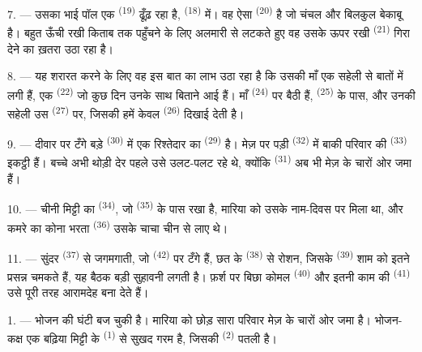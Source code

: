 \VUsaut{5.0mm}
\VUsaut{3.0mm}

7. --- उसका भाई पॉल एक  \textsuperscript{(19)} ढूँढ़ रहा है,
 \textsuperscript{(18)} में। वह ऐसा 
\textsuperscript{(20)} है जो चंचल और बिलकुल बेकाबू है। बहुत ऊँची रखी किताब तक
पहुँचने के लिए अलमारी से लटकते हुए वह उसके ऊपर रखी 
\textsuperscript{(21)} गिरा देने का ख़तरा उठा रहा है।

8. --- यह शरारत करने के लिए वह इस बात का लाभ उठा रहा है कि उसकी माँ एक सहेली से
बातों में लगी हैं, एक  \textsuperscript{(22)} जो कुछ दिन उनके साथ
बिताने आई हैं। माँ  \textsuperscript{(24)} पर बैठी हैं,
 \textsuperscript{(25)} के पास, और उनकी सहेली उस
 \textsuperscript{(27)} पर, जिसकी हमें केवल 
\textsuperscript{(26)} दिखाई देती है।

9. --- दीवार पर टँगे बड़े  \textsuperscript{(30)} में एक रिश्तेदार
का  \textsuperscript{(29)} है। मेज़ पर पड़ी 
\textsuperscript{(32)} में बाकी परिवार की  \textsuperscript{(33)}
इकट्ठी हैं। बच्चे अभी थोड़ी देर पहले उसे उलट-पलट रहे थे, क्योंकि
 \textsuperscript{(31)} अब भी मेज़ के चारों ओर जमा हैं।

10. --- चीनी मिट्टी का  \textsuperscript{(34)}, जो
 \textsuperscript{(35)} के पास रखा है, मारिया को उसके नाम-दिवस पर मिला था,
और कमरे का कोना भरता  \textsuperscript{(36)} उसके चाचा
चीन से लाए थे।

11. --- सुंदर  \textsuperscript{(37)} से जगमगाती, जो
 \textsuperscript{(42)} पर टँगे हैं, छत के  \textsuperscript{(38)}
से रोशन, जिसके  \textsuperscript{(39)} शाम को इतने प्रसन्न
चमकते हैं, यह बैठक बड़ी सुहावनी लगती है। फ़र्श पर बिछा कोमल 
\textsuperscript{(40)} और इतनी काम की  \textsuperscript{(41)}
उसे पूरी तरह आरामदेह बना देते हैं।

\VUsaut{3.6mm}
\VUsaut{3.0mm}

1. --- भोजन की घंटी बज चुकी है। मारिया को छोड़ सारा परिवार मेज़ के चारों ओर
जमा है। भोजन-कक्ष एक बढ़िया मिट्टी के  \textsuperscript{(1)} से
सुखद गरम है, जिसकी  \textsuperscript{(2)} पतली है।

